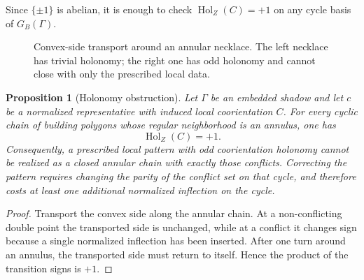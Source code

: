 \documentclass[11pt]{article}
\newtheorem{proposition}[theorem]{Proposition}
\newcommand{\Hol}{\operatorname{Hol}}
\begin{document}
Since $\{\pm1\}$ is abelian, it is enough to check $\Hol_Z(C)=+1$ on any cycle basis of $G_B(\Gamma)$.

\begin{figure}[t]
\centering
{}
\caption{Convex-side transport around an annular necklace.  The left necklace has trivial holonomy; the right one has odd holonomy and cannot close with only the prescribed local data.}
\label{fig:holonomy}
\end{figure}

\begin{proposition}[Holonomy obstruction]\label{prop:holonomyobstruction}
Let $\Gamma$ be an embedded shadow and let $c$ be a normalized representative with induced local coorientation $C$.  For every cyclic chain of building polygons whose regular neighborhood is an annulus, one has
\[
 \Hol_Z(C)=+1.
\]
Consequently, a prescribed local pattern with odd coorientation holonomy cannot be realized as a closed annular chain with exactly those conflicts.  Correcting the pattern requires changing the parity of the conflict set on that cycle, and therefore costs at least one additional normalized inflection on the cycle.
\end{proposition}

\begin{proof}
Transport the convex side along the annular chain.  At a non-conflicting double point the transported side is unchanged, while at a conflict it changes sign because a single normalized inflection has been inserted.  After one turn around an annulus, the transported side must return to itself.  Hence the product of the transition signs is $+1$.
\end{proof}
\end{document}
